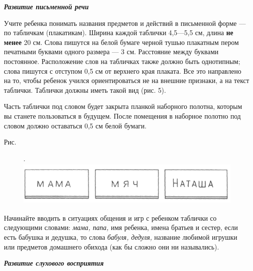 \documentclass[a5paper]{book}
\renewcommand{\emph}[1]{\textit{#1}}
\begin{document}
\emph{\textbf{Развитие письменной речи}}

Учите ребенка понимать названия предметов и действий в письменной форме
--- по табличкам (плакатикам). Ширина каждой таблички 4,5---5,5 см,
длина \textbf{не менее} 20 см. Слова пишутся на белой бумаге черной
тушью плакатным пером печатными буквами одного размера --- 3 см.
Расстояние между буквами постоянное. Расположение слов на табличках
также должно быть однотипным; слова пишутся с отступом 0,5 см от
верхнего края плаката. Все это направлено на то, чтобы ребенок учился
ориентироваться не на внешние признаки, а на текст таблички. Таблички
должны иметь такой вид (рис. 5).

Часть таблички под словом будет закрыта планкой наборного полотна,
которым вы станете пользоваться в будущем. После помещения в наборное
полотно под словом должно оставаться 0,5 см белой бумаги.

Рис.
\begin{figure}
.\includegraphics[width=4.71319in,height=0.87361in]{media/media/image5.jpg}
\end{figure}

Начинайте вводить в ситуациях общения и игр с ребенком таблички со
следующими словами: \emph{мама, папа,} имя ребенка, имена братьев и
сестер, если есть бабушка и дедушка, то слова \emph{бабуля, дедуля,}
название любимой игрушки или предметов домашнего обихода (как бы сложно
они ни назывались).

\emph{\textbf{Развитие слухового восприятия}}
\end{document}
